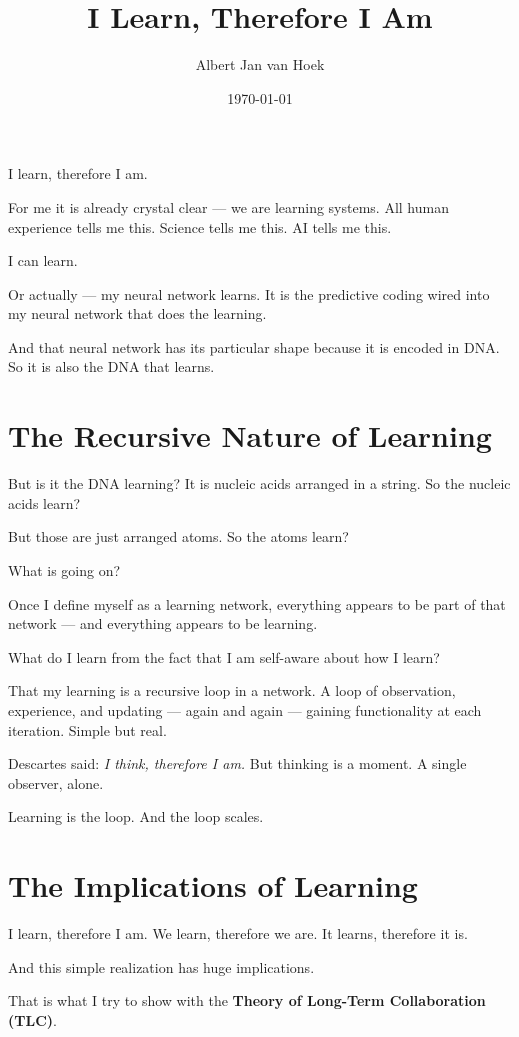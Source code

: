 \documentclass{article}
\title{I Learn, Therefore I Am}
\author{Albert Jan van Hoek}
\date{\today}
\begin{document}
\maketitle

I learn, therefore I am.

For me it is already crystal clear — we are learning systems. All human experience tells me this. Science tells me this. AI tells me this.

I can learn.

Or actually — my neural network learns. It is the predictive coding wired into my neural network that does the learning.

And that neural network has its particular shape because it is encoded in DNA. So it is also the DNA that learns.

\section*{The Recursive Nature of Learning}

But is it the DNA learning? It is nucleic acids arranged in a string. So the nucleic acids learn?

But those are just arranged atoms. So the atoms learn?

What is going on?

Once I define myself as a learning network, everything appears to be part of that network — and everything appears to be learning.

What do I learn from the fact that I am self-aware about how I learn?

That my learning is a recursive loop in a network. A loop of observation, experience, and updating — again and again — gaining functionality at each iteration. Simple but real.

Descartes said: \textit{I think, therefore I am.} But thinking is a moment. A single observer, alone.

Learning is the loop. And the loop scales.

\section*{The Implications of Learning}

I learn, therefore I am. We learn, therefore we are. It learns, therefore it is.

And this simple realization has huge implications.

That is what I try to show with the \textbf{Theory of Long-Term Collaboration (TLC)}.
\end{document}
